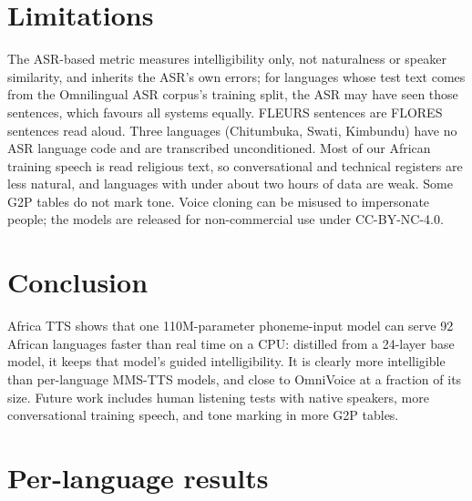 \documentclass[10pt,twocolumn]{article}
\newcommand{\att}{Africa TTS}
\begin{document}
\section{Limitations}
The ASR-based metric measures intelligibility only, not naturalness or speaker similarity, and
inherits the ASR's own errors; for languages whose test text comes from the Omnilingual ASR
corpus's training split, the ASR may have seen those sentences, which favours all systems
equally. FLEURS sentences are FLORES sentences read aloud. Three languages (Chitumbuka, Swati,
Kimbundu) have no ASR language code and are transcribed unconditioned. Most of our African
training speech is read religious text, so conversational and technical registers are less
natural, and languages with under about two hours of data are weak. Some G2P tables do not
mark tone. Voice cloning can be
misused to impersonate people; the models are released for non-commercial use under
CC-BY-NC-4.0.

\section{Conclusion}
\att{} shows that one 110M-parameter phoneme-input model can serve 92 African languages
faster than real time on a CPU: distilled from a 24-layer base model, it keeps that model's
guided intelligibility. It
is clearly more intelligible than per-language MMS-TTS models, and close to OmniVoice at a
fraction of its size. Future work includes
human listening tests with native speakers, more conversational training speech, and tone
marking in more G2P tables.




\onecolumn
\appendix
\section{Per-language results}

\end{document}
